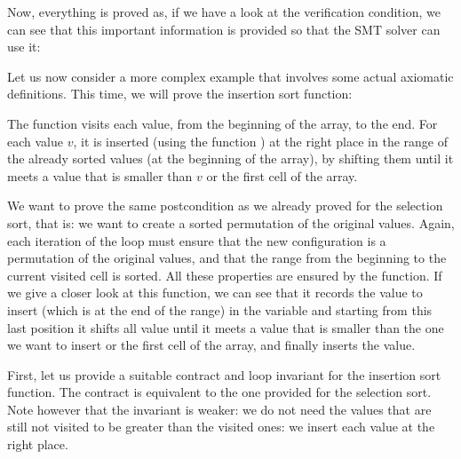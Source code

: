 


Now, everything is proved as, if we have a look at the verification condition,
we can see that this important information is provided so that the SMT solver
can use it:








Let us now consider a more complex example that involves some actual axiomatic
definitions. This time, we will prove the insertion sort function:





The  function visits each value, from the beginning
of the array, to the end. For each value $v$, it is inserted (using the
function ) at the right place in the range of the already
sorted values (at the beginning of the array), by shifting them until it meets
a value that is smaller than $v$ or the first cell of the array.




We want to prove the same postcondition as we already proved for the selection
sort, that is: we want to create a sorted permutation of the original values.
Again, each iteration of the loop must ensure that the new configuration is a
permutation of the original values, and that the range from the beginning to
the current visited cell is sorted. All these properties are ensured by the
 function. If we give a closer look at this function, we can
see that it records the value to insert (which is at the end of the range) in
the variable  and starting from this last position it shifts
all value until it meets a value that is smaller than the one we want to insert
or the first cell of the array, and finally inserts the value.




First, let us provide a suitable contract and loop invariant for the insertion
sort function. The contract is equivalent to the one provided for the selection
sort. Note however that the invariant is weaker: we do not need the values that
are still not visited to be greater than the visited ones: we insert each value
at the right place.



